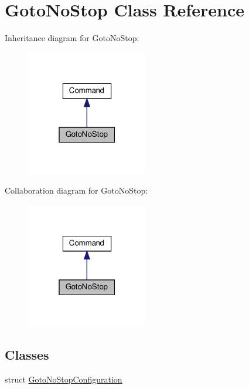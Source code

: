 \hypertarget{classGotoNoStop}{}\section{Goto\+No\+Stop Class Reference}
\label{classGotoNoStop}


Inheritance diagram for Goto\+No\+Stop\+:
\nopagebreak
\begin{figure}[H]
\begin{center}
\leavevmode
\includegraphics[width=151pt]{classGotoNoStop__inherit__graph}
\end{center}
\end{figure}


Collaboration diagram for Goto\+No\+Stop\+:
\nopagebreak
\begin{figure}[H]
\begin{center}
\leavevmode
\includegraphics[width=151pt]{classGotoNoStop__coll__graph}
\end{center}
\end{figure}
\subsection*{Classes}
\begin{DoxyCompactItemize}
\item 
struct \hyperlink{structGotoNoStop_1_1GotoNoStopConfiguration}{Goto\+No\+Stop\+Configuration}
\end{DoxyCompactItemize}
